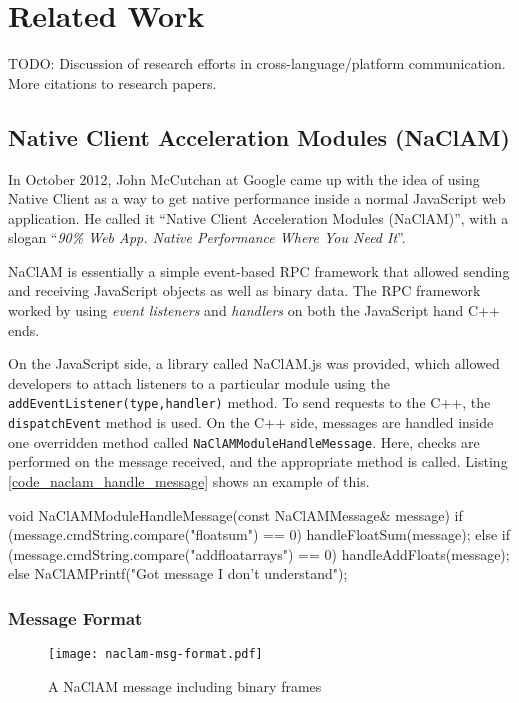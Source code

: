 \chapter{Related Work} 
\label{Chapter3} 
TODO: Discussion of research efforts in cross-language/platform communication. More citations to research papers.
\section{Native Client Acceleration Modules (NaClAM)} %
\label{sec:naclam}

In October 2012, John McCutchan at Google came up with the idea of using Native Client as a way to get native performance inside a normal JavaScript web application. He called it ``Native Client Acceleration Modules (NaClAM)'', with a slogan ``\emph{90\% Web App. Native Performance Where You Need It}''.

NaClAM is essentially a simple event-based RPC framework that allowed sending and receiving JavaScript objects as well as binary data. The RPC framework worked by using \emph{event listeners} and \emph{handlers} on both the JavaScript hand C++ ends. 

On the JavaScript side, a library called NaClAM.js was provided, which allowed developers to attach listeners to a particular module using the \lstinline{addEventListener(type,handler)} method. To send requests to the C++, the \lstinline{dispatchEvent} method is used. On the C++ side, messages are handled inside one overridden method called \lstinline{NaClAMModuleHandleMessage}. Here, checks are performed on the message received, and the appropriate method is called. Listing \ref{code_naclam_handle_message} shows an example of this. 

\begin{code}
void NaClAMModuleHandleMessage(const NaClAMMessage& message) {
  if (message.cmdString.compare("floatsum") == 0) {
    handleFloatSum(message);
  } else if (message.cmdString.compare("addfloatarrays") == 0) {
    handleAddFloats(message);
  } else {
    NaClAMPrintf("Got message I don't understand");
  }
}
\end{code}

\subsection{Message Format} %
\label{sub:naclam_message_format}
\begin{figure}
	\centering
	\texttt{[image: naclam-msg-format.pdf]} 
	\caption{A NaClAM message including binary frames}
	\label{fig:naclam_msg_format}
\end{figure}

